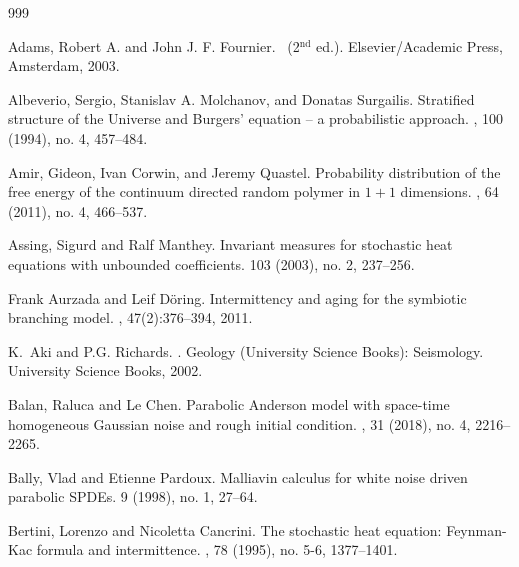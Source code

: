 \documentclass[a4paper,12pt]{article}
\theoremstyle{plain}
\theoremstyle{definition}
\begin{document}
\begin{thebibliography}{999}


Adams, Robert A. and John J. F. Fournier.
~(2$^{\text{nd}}$ ed.).
\newblock Elsevier/Academic Press, Amsterdam, 2003.



Albeverio, Sergio,  Stanislav A. Molchanov, and  Donatas Surgailis.
\newblock Stratified structure of the Universe and Burgers' equation -- a probabilistic approach. 
, 100 (1994), no. 4, 457--484. 


Amir, Gideon, Ivan Corwin, and Jeremy Quastel.
\newblock Probability distribution of the free energy of the continuum directed
  random polymer in {$1+1$} dimensions.
, 64 (2011), no. 4, 466--537.

Assing, Sigurd and Ralf Manthey.
\newblock Invariant measures for stochastic heat equations with unbounded coefficients. 
 103 (2003), no. 2, 237--256.

Frank Aurzada and Leif D{\"o}ring.
\newblock Intermittency and aging for the symbiotic branching model.
, 47(2):376--394,
  2011.

K.~Aki and P.G. Richards.
.
\newblock Geology (University Science Books): Seismology. University Science
  Books, 2002.

Balan, Raluca and Le Chen.
\newblock Parabolic Anderson model with space-time homogeneous Gaussian noise
and rough initial condition.
, 31 (2018), no. 4, 2216--2265.


Bally, Vlad and Etienne Pardoux.
\newblock Malliavin calculus for white noise driven parabolic {SPDEs}.
 9 (1998), no. 1, 27--64.


Bertini, Lorenzo and Nicoletta Cancrini.
\newblock The stochastic heat equation: {F}eynman-{K}ac formula and intermittence.
, 78 (1995), no. 5-6, 1377--1401.


\end{thebibliography}
\end{document}
